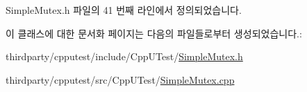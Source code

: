 Simple\+Mutex.\+h 파일의 41 번째 라인에서 정의되었습니다.



이 클래스에 대한 문서화 페이지는 다음의 파일들로부터 생성되었습니다.\+:\begin{DoxyCompactItemize}
\item 
thirdparty/cpputest/include/\+Cpp\+U\+Test/\hyperlink{_simple_mutex_8h}{Simple\+Mutex.\+h}\item 
thirdparty/cpputest/src/\+Cpp\+U\+Test/\hyperlink{_simple_mutex_8cpp}{Simple\+Mutex.\+cpp}\end{DoxyCompactItemize}
